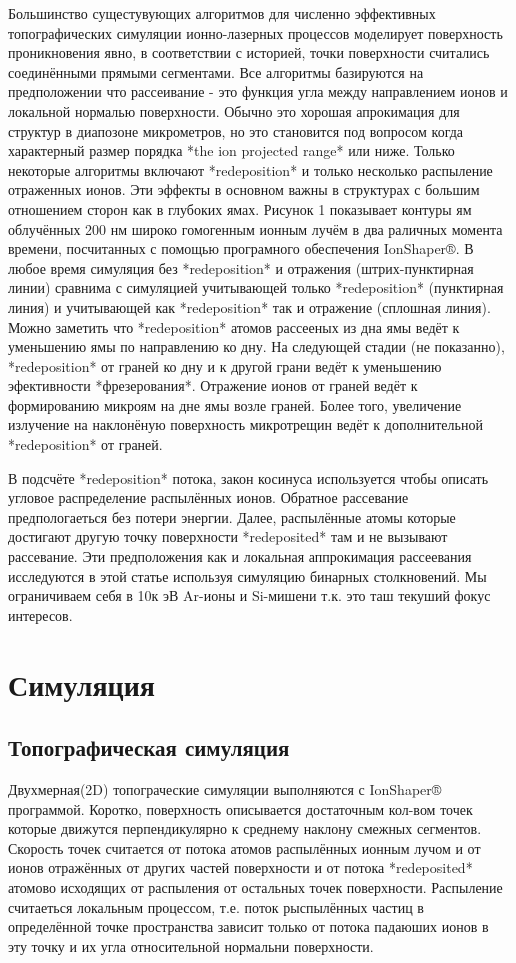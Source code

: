 \documentclass[a4paper,fontsize=12pt]{article}
\begin{document}
Большинство сущестувующих алгоритмов для численно эффективных топографических симуляции ионно-лазерных процессов моделирует поверхность проникновения явно, в соответствии с историей, точки поверхности считались соединёнными прямыми сегментами. Все алгоритмы базируются на предположении что рассеивание - это функция угла между направлением ионов и локальной нормалью поверхности. Обычно это хорошая апрокимация для структур в диапозоне микрометров, но это становится под вопросом когда характерный размер порядка *the ion projected range* или ниже. Только некоторые алгоритмы включают *redeposition* и только несколько распыление отраженных ионов. Эти эффекты в основном важны в структурах с большим отношением сторон как в глубоких ямах. Рисунок 1 показывает контуры ям облучённых 200 нм широко гомогенным ионным лучём в два раличных момента времени, посчитанных с помощью програмного обеспечения IonShaper®. В любое время симуляция без *redeposition* и отражения (штрих-пунктирная линии) сравнима с симуляцией учитывающей только *redeposition* (пунктирная линия) и учитывающей как *redeposition* так и отражение (сплошная линия). Можно заметить что *redeposition* атомов рассееных из дна ямы ведёт к уменьшению ямы по направлению ко дну. На следующей стадии (не показанно), *redeposition* от граней ко дну  и к другой грани ведёт к уменьшению эфективности *фрезерования*. Отражение ионов от граней ведёт к формированию микроям на дне ямы возле граней. Более того, увеличение излучение на наклонёную поверхность микротрещин ведёт к дополнительной *redeposition* от граней.

В подсчёте *redeposition* потока, закон косинуса используется чтобы описать угловое распределение распылённых ионов. Обратное рассевание предпологаеться без потери энергии. Далее, распылённые атомы которые достигают другую точку поверхности *redeposited* там и не вызывают рассевание. Эти предположения как и локальная аппрокимация рассеевания исследуются в этой статье используя симуляцию бинарных столкновений. Мы ограничиваем себя в 10к эВ Ar-ионы и Si-мишени т.к. это таш текуший фокус интересов.

\section{Симуляция}
\subsection{Топографическая симуляция}

Двухмерная(2D) топограческие симуляции выполняются с IonShaper® программой. Коротко, поверхность описывается достаточным кол-вом точек которые движутся перпендикулярно к среднему наклону смежных сегментов. Скорость точек считается от потока атомов распылённых ионным лучом и от ионов отражённых от других частей поверхности и от потока *redeposited* атомово исходящих от распыления от остальных точек поверхности. Распыление считаеться локальным процессом, т.е. поток рыспылённых частиц в определённой точке пространства зависит только от потока падаюших ионов в эту точку и их угла относительной нормальни поверхности.
\end{document}
